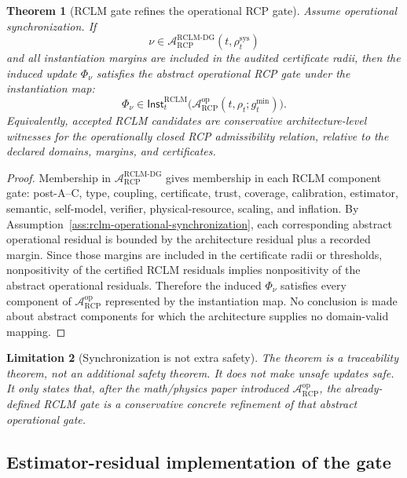 \documentclass[11pt,a4paper]{article}
\newtheorem{theorem}{Theorem}[section]
\newtheorem{limitation}[theorem]{Limitation}
\newcommand{\Acal}{\mathcal A}
\newcommand{\RCP}{\mathrm{RCP}}
\newcommand{\RCLM}{\mathrm{RCLM}}
\newcommand{\DG}{\mathrm{DG}}
\newcommand{\sys}{\mathrm{sys}}
\begin{document}
\begin{theorem}[RCLM gate refines the operational RCP gate]
\label{thm:rclm-gate-refines-operational-rcp}
Assume operational synchronization.  If
\[
\nu\in\Acal_{\RCP}^{\RCLM\text{-}\DG}(t,\rho_t^{\sys})
\]
and all instantiation margins are included in the audited certificate radii, then the induced update \(\Phi_\nu\) satisfies the abstract operational RCP gate under the instantiation map:
\[
\Phi_\nu\in
\mathsf{Inst}_t^{\RCLM}\!\bigl(\Acal_{\RCP}^{\mathrm{op}}(t,\rho_t;g_t^{\min})\bigr).
\]
Equivalently, accepted RCLM candidates are conservative architecture-level witnesses for the operationally closed RCP admissibility relation, relative to the declared domains, margins, and certificates.
\end{theorem}

\begin{proof}
Membership in \(\Acal_{\RCP}^{\RCLM\text{-}\DG}\) gives membership in each RCLM component gate: post-A--C, type, coupling, certificate, trust, coverage, calibration, estimator, semantic, self-model, verifier, physical-resource, scaling, and inflation.  By Assumption~\ref{ass:rclm-operational-synchronization}, each corresponding abstract operational residual is bounded by the architecture residual plus a recorded margin.  Since those margins are included in the certificate radii or thresholds, nonpositivity of the certified RCLM residuals implies nonpositivity of the abstract operational residuals.  Therefore the induced \(\Phi_\nu\) satisfies every component of \(\Acal_{\RCP}^{\mathrm{op}}\) represented by the instantiation map.  No conclusion is made about abstract components for which the architecture supplies no domain-valid mapping.
\end{proof}

\begin{limitation}[Synchronization is not extra safety]
The theorem is a traceability theorem, not an additional safety theorem.  It does not make unsafe updates safe.  It only states that, after the math/physics paper introduced \(\Acal_{\RCP}^{\mathrm{op}}\), the already-defined RCLM gate is a conservative concrete refinement of that abstract operational gate.
\end{limitation}

\subsection{Estimator-residual implementation of the gate}
\end{document}
